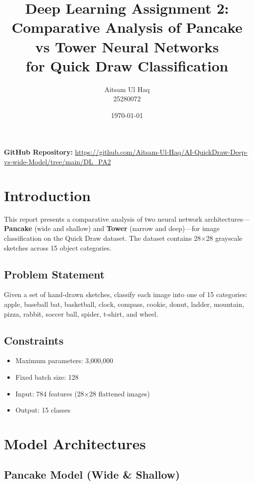 \documentclass[11pt]{article}
\title{\textbf{Deep Learning Assignment 2:\\Comparative Analysis of Pancake vs Tower Neural Networks\\for Quick Draw Classification}}
\author{Aitsam Ul Haq \\ 25280072}
\date{\today}
\begin{document}
\maketitle{}

\vspace{0.5cm}
\small
\centerline{\textbf{GitHub Repository:} \url{https://github.com/Aitsam-Ul-Haq/AI-QuickDraw-Deep-vs-wide-Model/tree/main/DL_PA2}}
\normalsize
\vspace{0.5cm}

\section{Introduction}

This report presents a comparative analysis of two neural network architectures---\textbf{Pancake} (wide and shallow) and \textbf{Tower} (narrow and deep)---for image classification on the Quick Draw dataset. The dataset contains 28$\times$28 grayscale sketches across 15 object categories.

\subsection{Problem Statement}
Given a set of hand-drawn sketches, classify each image into one of 15 categories: apple, baseball bat, basketball, clock, compass, cookie, donut, ladder, mountain, pizza, rabbit, soccer ball, spider, t-shirt, and wheel.

\subsection{Constraints}
\begin{itemize}
    \item Maximum parameters: 3,000,000
    \item Fixed batch size: 128
    \item Input: 784 features (28$\times$28 flattened images)
    \item Output: 15 classes
\end{itemize}

\section{Model Architectures}

\subsection{Pancake Model (Wide \& Shallow)}
\end{document}
